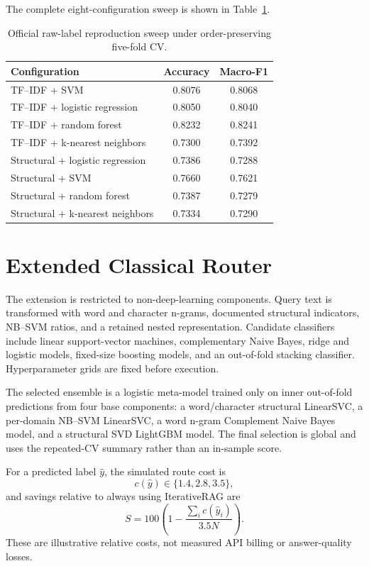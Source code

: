 \documentclass[conference]{IEEEtran}
\begin{document}
The complete eight-configuration sweep is shown in Table~\ref{tab:official-sweep}.

\begin{table}[t]
\centering
\caption{Official raw-label reproduction sweep under order-preserving five-fold CV.}
\label{tab:official-sweep}
\begin{tabular}{lcc}
\toprule
Configuration & Accuracy & Macro-F1 \\
\midrule
TF--IDF + SVM & 0.8076 & 0.8068 \\
TF--IDF + logistic regression & 0.8050 & 0.8040 \\
TF--IDF + random forest & 0.8232 & 0.8241 \\
TF--IDF + k-nearest neighbors & 0.7300 & 0.7392 \\
Structural + logistic regression & 0.7386 & 0.7288 \\
Structural + SVM & 0.7660 & 0.7621 \\
Structural + random forest & 0.7387 & 0.7279 \\
Structural + k-nearest neighbors & 0.7334 & 0.7290 \\
\bottomrule
\end{tabular}
\end{table}

\section{Extended Classical Router}
The extension is restricted to non-deep-learning components. Query text is transformed with word and character n-grams, documented structural indicators, NB--SVM ratios, and a retained nested representation. Candidate classifiers include linear support-vector machines, complementary Naive Bayes, ridge and logistic models, fixed-size boosting models, and an out-of-fold stacking classifier. Hyperparameter grids are fixed before execution.

The selected ensemble is a logistic meta-model trained only on inner out-of-fold predictions from four base components: a word/character structural LinearSVC, a per-domain NB--SVM LinearSVC, a word n-gram Complement Naive Bayes model, and a structural SVD LightGBM model. The final selection is global and uses the repeated-CV summary rather than an in-sample score.

For a predicted label $\hat y$, the simulated route cost is
\begin{equation}
c(\hat y) \in \{1.4, 2.8, 3.5\},
\end{equation}
and savings relative to always using IterativeRAG are
\begin{equation}
S = 100\left(1 - \frac{\sum_i c(\hat y_i)}{3.5N}\right).
\end{equation}
These are illustrative relative costs, not measured API billing or answer-quality losses.
\end{document}
